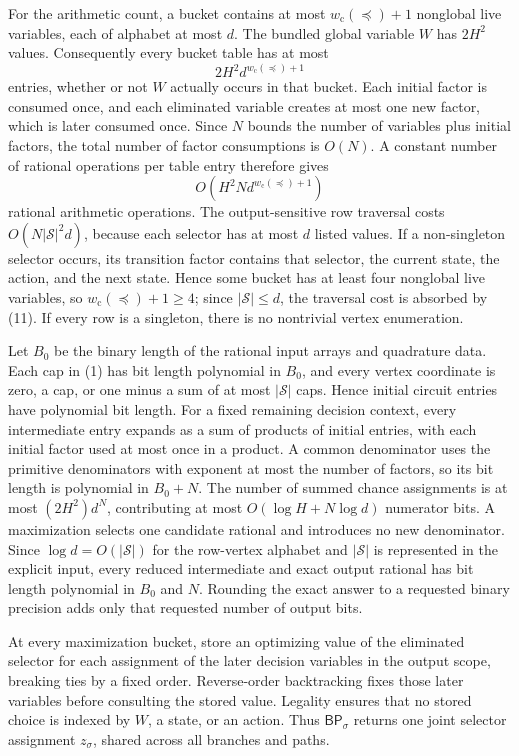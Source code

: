 For the arithmetic count, a bucket contains at most \(w_{\mathrm c}(\preceq)+1\) nonglobal live variables, each of alphabet at most \(d\).  The bundled global variable \(W\) has \(2H^2\) values.  Consequently every bucket table has at most
\[
 2H^2d^{w_{\mathrm c}(\preceq)+1}
 \tag{10}
\]
entries, whether or not \(W\) actually occurs in that bucket.  Each initial factor is consumed once, and each eliminated variable creates at most one new factor, which is later consumed once.  Since \(N\) bounds the number of variables plus initial factors, the total number of factor consumptions is \(O(N)\).  A constant number of rational operations per table entry therefore gives
\[
 O\!\left(H^2N d^{w_{\mathrm c}(\preceq)+1}\right)
 \tag{11}
\]
rational arithmetic operations.  The output-sensitive row traversal costs \(O(N|\mathcal S|^2d)\), because each selector has at most \(d\) listed values.  If a non-singleton selector occurs, its transition factor contains that selector, the current state, the action, and the next state.  Hence some bucket has at least four nonglobal live variables, so \(w_{\mathrm c}(\preceq)+1\ge4\); since \(|\mathcal S|\le d\), the traversal cost is absorbed by (11).  If every row is a singleton, there is no nontrivial vertex enumeration.

Let \(B_0\) be the binary length of the rational input arrays and quadrature data.  Each cap in (1) has bit length polynomial in \(B_0\), and every vertex coordinate is zero, a cap, or one minus a sum of at most \(|\mathcal S|\) caps.  Hence initial circuit entries have polynomial bit length.  For a fixed remaining decision context, every intermediate entry expands as a sum of products of initial entries, with each initial factor used at most once in a product.  A common denominator uses the primitive denominators with exponent at most the number of factors, so its bit length is polynomial in \(B_0+N\).  The number of summed chance assignments is at most \((2H^2)d^N\), contributing at most \(O(\log H+N\log d)\) numerator bits.  A maximization selects one candidate rational and introduces no new denominator.  Since \(\log d=O(|\mathcal S|)\) for the row-vertex alphabet and \(|\mathcal S|\) is represented in the explicit input, every reduced intermediate and exact output rational has bit length polynomial in \(B_0\) and \(N\).  Rounding the exact answer to a requested binary precision adds only that requested number of output bits.

At every maximization bucket, store an optimizing value of the eliminated selector for each assignment of the later decision variables in the output scope, breaking ties by a fixed order.  Reverse-order backtracking fixes those later variables before consulting the stored value.  Legality ensures that no stored choice is indexed by \(W\), a state, or an action.  Thus \(\mathsf{BP}_\sigma\) returns one joint selector assignment \(z_\sigma\), shared across all branches and paths.

